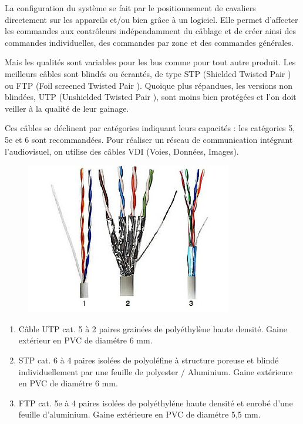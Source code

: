 \documentclass[12pt]{article}
\begin{document}
La configuration du système se fait par le positionnement de cavaliers directement sur les appareils et/ou bien grâce à un logiciel. Elle permet d'affecter les commandes aux contrôleurs indépendamment du câblage et de créer ainsi des commandes individuelles, des commandes par zone et des commandes générales.

Mais les qualités sont variables pour les bus comme pour tout autre produit. Les meilleurs câbles sont blindés ou écrantés, de type STP (Shielded Twisted Pair ) ou FTP (Foil screened Twisted Pair ). Quoique plus répandues, les versions non blindées, UTP (Unshielded Twisted Pair ), sont moins bien protégées et l’on doit veiller à la qualité de leur gainage.

Ces câbles se déclinent par catégories indiquant leurs capacités : les catégories 5, 5e et 6 sont recommandées. Pour réaliser un réseau de communication intégrant l’audiovisuel, on utilise des câbles VDI (Voies, Données, Images).

\begin{figure}[h]
\begin{center}
\includegraphics[scale=0.75]{cable.png}
\end{center}
\end{figure}

\begin{enumerate}
\item Câble UTP cat. 5 à 2 paires grainées de polyéthylène haute densité. Gaine extérieur en PVC de diamétre 6 mm.
\item STP cat. 6 à 4 paires isolées de polyoléfine à structure poreuse et blindé individuellement par une feuille de polyester / Aluminium. Gaine extérieure en PVC de diamétre 6 mm.
\item FTP cat. 5e à 4 paires isolées de polyéthyléne haute densité et enrobé d'une feuille d'aluminium. Gaine extérieure en PVC de diamétre 5,5 mm.
\end{enumerate}
\end{document}

